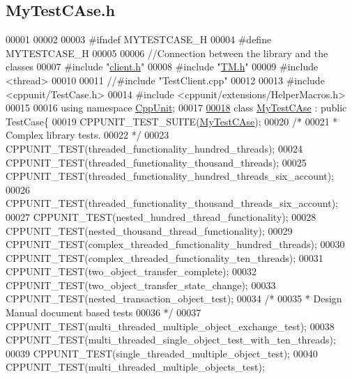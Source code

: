 \hypertarget{_my_test_c_ase_8h_source}{}\subsection{My\+Test\+C\+Ase.\+h}

\begin{DoxyCode}
00001 
00002 
00003 \textcolor{preprocessor}{#ifndef MYTESTCASE\_H}
00004 \textcolor{preprocessor}{#define MYTESTCASE\_H}
00005 
00006 \textcolor{comment}{//Connection between the library and the classes}
00007 \textcolor{preprocessor}{#include "\hyperlink{client_8h}{client.h}"}
00008 \textcolor{preprocessor}{#include "\hyperlink{_t_m_8h}{TM.h}"}
00009 \textcolor{preprocessor}{#include <thread>}
00010 
00011 \textcolor{comment}{//#include "TestClient.cpp"}
00012 
00013 \textcolor{preprocessor}{#include <cppunit/TestCase.h>}
00014 \textcolor{preprocessor}{#include <cppunit/extensions/HelperMacros.h>}
00015 
00016 \textcolor{keyword}{using namespace }\hyperlink{namespace_cpp_unit}{CppUnit};
00017 
\hypertarget{_my_test_c_ase_8h_source.tex_l00018}{}\hyperlink{class_my_test_c_ase}{00018} \textcolor{keyword}{class }\hyperlink{class_my_test_c_ase}{MyTestCAse} : \textcolor{keyword}{public} TestCase\{
00019     CPPUNIT\_TEST\_SUITE(\hyperlink{class_my_test_c_ase}{MyTestCAse});
00020     \textcolor{comment}{/*}
00021 \textcolor{comment}{     * Complex library tests.}
00022 \textcolor{comment}{     */}
00023     CPPUNIT\_TEST(threaded\_functionality\_hundred\_threads);
00024     CPPUNIT\_TEST(threaded\_functionality\_thousand\_threads);
00025     CPPUNIT\_TEST(threaded\_functionality\_hundred\_threads\_six\_account);
00026     CPPUNIT\_TEST(threaded\_functionality\_thousand\_threads\_six\_account);
00027     CPPUNIT\_TEST(nested\_hundred\_thread\_functionality); 
00028     CPPUNIT\_TEST(nested\_thousand\_thread\_functionality);
00029     CPPUNIT\_TEST(complex\_threaded\_functionality\_hundred\_threads);
00030     CPPUNIT\_TEST(complex\_threaded\_functionality\_ten\_threads);
00031     CPPUNIT\_TEST(two\_object\_transfer\_complete);
00032     CPPUNIT\_TEST(two\_object\_transfer\_state\_change);
00033     CPPUNIT\_TEST(nested\_transaction\_object\_test);
00034     \textcolor{comment}{/*}
00035 \textcolor{comment}{     * Design Manual document based tests}
00036 \textcolor{comment}{     */}
00037     CPPUNIT\_TEST(multi\_threaded\_multiple\_object\_exchange\_test);
00038     CPPUNIT\_TEST(multi\_threaded\_single\_object\_test\_with\_ten\_threads);
00039     CPPUNIT\_TEST(single\_threaded\_multiple\_object\_test);
00040     CPPUNIT\_TEST(multi\_threaded\_multiple\_objects\_test);

\end{DoxyCode}
